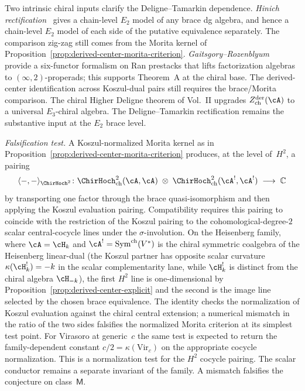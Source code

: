 \begin{remark}
\label{rem:derived-center-sharpened-scope}%
%
Two intrinsic chiral inputs clarify the Deligne--Tamarkin dependence.
\emph{Hinich rectification~\textup{\cite{Hin97}}} gives a
chain-level $E_2$ model of any brace dg algebra, and hence a
chain-level $E_2$ model of each side of the putative equivalence
separately. The comparison zig-zag still comes from the Morita kernel
of Proposition~\ref{prop:derived-center-morita-criterion}.
\emph{Gaitsgory--Rozenblyum~\textup{\cite{GR17}}}
provide a six-functor formalism on Ran prestacks that lifts
factorization algebras to $(\infty, 2)$-properads; this supports
Theorem~A at the chiral base. The derived-center identification
across Koszul-dual pairs still requires the brace/Morita comparison.
The chiral Higher Deligne theorem of
Vol.~II upgrades $Z^{\mathrm{der}}_{\mathrm{ch}}(\cA)$ to a
universal $E_3$-chiral algebra. The Deligne--Tamarkin rectification
remains the substantive input at the $E_2$ brace level.

\emph{Falsification test.} A Koszul-normalized Morita kernel as in
Proposition~\ref{prop:derived-center-morita-criterion} produces, at
the level of~$H^2$, a pairing
\[
 \langle -, - \rangle_{\ChirHoch^2}
 \colon
 \ChirHoch^2_{\mathrm{ch}}(\cA, \cA)
 \;\otimes\;
 \ChirHoch^2_{\mathrm{ch}}(\cA^!, \cA^!)
 \;\longrightarrow\; \mathbb{C}
\]
by transporting one factor through the brace quasi-isomorphism and
then applying the Koszul evaluation pairing. Compatibility requires
this pairing to coincide with the restriction of the Koszul pairing
to the cohomological-degree-$2$ scalar central-cocycle lines under the
$\sigma$-involution. On the Heisenberg family, where
$\cA = \cH_k$ and
$\cA^! = \operatorname{Sym}^{\mathrm{ch}}(V^*)$ is the chiral
symmetric coalgebra of the Heisenberg linear-dual
\textup{(}the Koszul partner has opposite scalar curvature
$\kappa(\cH_k^!)=-k$ in the scalar complementarity lane, while
$\cH_k^!$ is distinct from the chiral algebra $\cH_{-k}$\textup{)},
the first $H^2$ line is one-dimensional by
Proposition~\textup{\ref{prop:derived-center-explicit}} and the
second is the image line selected by the chosen brace equivalence.
The identity checks the normalization of Koszul evaluation against
the chiral central extension; a numerical mismatch in the ratio of
the two sides falsifies the normalized Morita criterion at its
simplest test point. For Virasoro at generic~$c$ the same test is
expected to return the family-dependent constant
$c/2 = \kappa(\mathrm{Vir}_c)$ on the appropriate cocycle
normalization. This is a normalization test for the $H^2$ cocycle
pairing. The scalar conductor remains a separate invariant of the
family. A mismatch falsifies the conjecture on
class~$\mathsf{M}$.
\end{remark}


